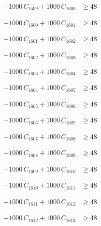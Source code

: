 \documentclass[a4paper,11pt]{article}
\begin{document}
\begin{align}
-1000\,C_{1599} + 1000\,C_{1600} &\geq 48 \nonumber
\end{align}

\begin{align}
-1000\,C_{1600} + 1000\,C_{1601} &\geq 48 \nonumber
\end{align}

\begin{align}
-1000\,C_{1601} + 1000\,C_{1602} &\geq 48 \nonumber
\end{align}

\begin{align}
-1000\,C_{1602} + 1000\,C_{1603} &\geq 48 \nonumber
\end{align}

\begin{align}
-1000\,C_{1603} + 1000\,C_{1604} &\geq 48 \nonumber
\end{align}

\begin{align}
-1000\,C_{1604} + 1000\,C_{1605} &\geq 48 \nonumber
\end{align}

\begin{align}
-1000\,C_{1605} + 1000\,C_{1606} &\geq 48 \nonumber
\end{align}

\begin{align}
-1000\,C_{1606} + 1000\,C_{1607} &\geq 48 \nonumber
\end{align}

\begin{align}
-1000\,C_{1607} + 1000\,C_{1608} &\geq 48 \nonumber
\end{align}

\begin{align}
-1000\,C_{1608} + 1000\,C_{1609} &\geq 48 \nonumber
\end{align}

\begin{align}
-1000\,C_{1609} + 1000\,C_{1610} &\geq 48 \nonumber
\end{align}

\begin{align}
-1000\,C_{1610} + 1000\,C_{1611} &\geq 48 \nonumber
\end{align}

\begin{align}
-1000\,C_{1611} + 1000\,C_{1612} &\geq 48 \nonumber
\end{align}

\begin{align}
-1000\,C_{1612} + 1000\,C_{1613} &\geq 48 \nonumber
\end{align}
\end{document}
